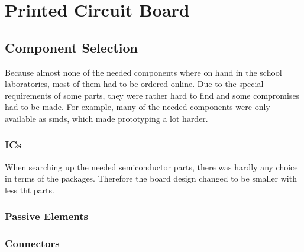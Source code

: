 \chapter{Printed Circuit Board}


\section{Component Selection}

Because almost none of the needed components where on hand in the school laboratories, most of them had to be ordered online. Due to the special requirements of some parts, they were rather hard to find and some compromises had to be made.
For example, many of the needed components were only available as \glspl{smd}, %
which made prototyping a lot harder.

\subsection{ICs}

When searching up the needed semiconductor parts, there was hardly any choice in terms of the packages. Therefore the board design changed to be smaller with less \gls{tht} parts.

\subsection{Passive Elements}



\subsection{Connectors}




